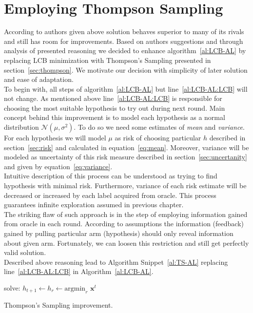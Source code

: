 \documentclass[12pt, a4paper, pdflatex, leqno]{report}
\begin{document}
\section{Employing Thompson Sampling}
According to authors given above solution behaves superior to many of its rivals and still has room for improvements. Based on authors suggestions and through analysis of presented reasoning we decided to enhance algorithm~\ref{al:LCB-AL} by replacing LCB minimization with Thompson's Sampling presented in section~\ref{sec:thompson}. We motivate our decision with simplicity of later solution and ease of adaptation.\\

To begin with, all steps of algorithm~\ref{al:LCB-AL} but line~\ref{al:LCB-AL:LCB} will not change. As mentioned above line~\ref{al:LCB-AL:LCB} is responsible for choosing the most suitable hypothesis to try out during next round. Main concept behind this improvement is to model each hypothesis as a normal distribution $\mathcal{N}\left( \mu, \sigma^2 \right)$. To do so we need some estimates of \emph{mean} and \emph{variance}. For each hypothesis we will model $\mu$ as risk of choosing particular $h$ described in section~\ref{sec:risk} and calculated in equation~\ref{eq:mean}. Moreover, variance will be modeled as uncertainty of this risk measure described in section~\ref{sec:uncertanity} and given by equation~\ref{eq:variance}.\\

Intuitive description of this process can be understood as trying to find hypothesis with minimal risk. Furthermore, variance of each risk estimate will be decreased or increased by each label acquired from oracle. This process guarantees infinite exploration assumed in previous chapter.\\
The striking flaw of such approach is in the step of employing information gained from oracle in each round. According to assumptions the information (feedback) gained by pulling particular arm (hypothesis) should only reveal information about given arm. Fortunately, we can loosen this restriction and still get perfectly valid solution.\\

Described above reasoning lead to Algorithm Snippet~\ref{al:TS-AL} replacing line~\ref{al:LCB-AL:LCB} in Algorithm~\ref{al:LCB-AL}.


\vspace{2cm}
\begin{algorithm}[H]
  solve: $h_{t+1} \leftarrow h_r \leftarrow \text{argmin}_{r} \text{~} \mathbf{x}^t$\;
 \caption{Thompson's Sampling improvement.\label{al:TS-AL}}
\end{algorithm}
\vspace{2cm}
\end{document}
